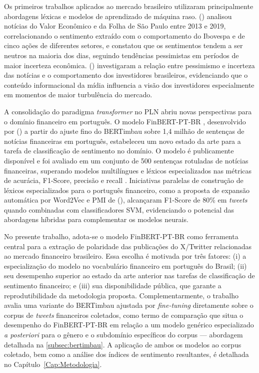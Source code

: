 Os primeiros trabalhos aplicados ao mercado brasileiro utilizaram principalmente abordagens léxicas e modelos de aprendizado de máquina raso. \citeauthor{falcao2020} (\citeyear{falcao2020}) analisou notícias do Valor Econômico e da Folha de São Paulo entre 2013 e 2019, correlacionando o sentimento extraído com o comportamento do Ibovespa e de cinco ações de diferentes setores, e constatou que os sentimentos tendem a ser neutros na maioria dos dias, seguindo tendências pessimistas em períodos de maior incerteza econômica. \citeauthor{galdi2018} (\citeyear{galdi2018}) investigaram a relação entre pessimismo e incerteza das notícias e o comportamento dos investidores brasileiros, evidenciando que o conteúdo informacional da mídia influencia a visão dos investidores especialmente em momentos de maior turbulência do mercado.

A consolidação do paradigma \textit{transformer} no PLN abriu novas perspectivas para o domínio financeiro em português. O modelo FinBERT-PT-BR \cite{santos2023finbert}, desenvolvido por \citeauthor{santos2023finbert} (\citeyear{santos2023finbert}) a partir do ajuste fino do BERTimbau \cite{souza2020} sobre 1,4 milhão de sentenças de notícias financeiras em português, estabeleceu um novo estado da arte para a tarefa de classificação de sentimento no domínio. O modelo é publicamente disponível e foi avaliado em um
conjunto de 500 sentenças rotuladas de notícias financeiras, superando modelos multilíngues e léxicos especializados nas métricas de acurácia, F1-Score, precisão e recall \cite{santos2023finbert}. Iniciativas paralelas de construção de léxicos especializados para o português financeiro, como a proposta de expansão automática por Word2Vec e PMI de \citeauthor{sousa2025} (\citeyear{sousa2025}), alcançaram F1-Score de 80\% em \textit{tweets} quando combinadas com classificadores SVM, evidenciando o potencial das abordagens híbridas para complementar os modelos neurais.

No presente trabalho, adota-se o modelo FinBERT-PT-BR como ferramenta central para a extração de polaridade das publicações do X/Twitter relacionadas ao mercado financeiro brasileiro. Essa escolha é motivada por três fatores: (i) a especialização do modelo no vocabulário financeiro em português do Brasil; (ii) seu desempenho superior ao estado da arte anterior nas tarefas de classificação de sentimento financeiro; e (iii) sua disponibilidade pública, que garante a reprodutibilidade da metodologia proposta. Complementarmente, o trabalho avalia uma variante do BERTimbau \cite{souza2020} ajustada por \textit{fine-tuning} diretamente sobre o corpus de \textit{tweets} financeiros coletados, como termo de comparação que situa o desempenho do FinBERT-PT-BR em relação a um modelo genérico especializado \textit{a posteriori} para o gênero e o subdomínio específicos do corpus --- abordagem detalhada na \autoref{subsec:bertimbau}. A aplicação de ambos os modelos ao corpus coletado, bem como a análise dos índices de sentimento resultantes, é detalhada no Capítulo~\ref{Cap:Metodologia}.